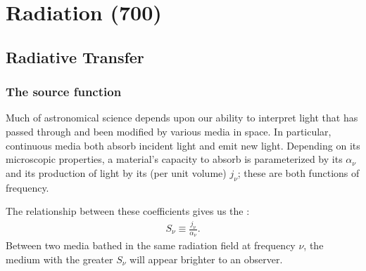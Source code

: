 \chapter{Radiation (700)}



\section{Radiative Transfer} \label{sec:radiative-transfer}
\subsection{The source function}
Much of astronomical science depends upon our ability to interpret light that has passed through and been modified by various media in space. In particular, continuous media both absorb incident light and emit new light. Depending on its microscopic properties, a material's capacity to absorb is parameterized by its  $\alpha_\nu$ and its production of light by its  (per unit volume) $j_\nu$; these are both functions of frequency.

The relationship between these coefficients gives us the :
\begin{align} \label{eq:source-function}
    S_\nu \equiv \frac{j_\nu}{\alpha_\nu}.
\end{align}
Between two media bathed in the same radiation field at frequency $\nu$, the medium with the greater $S_\nu$ will appear brighter to an observer.

